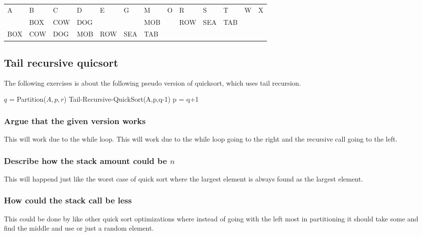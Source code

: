\documentclass[12pt, a4paper]{article}
\begin{document}
\begin{table}[h!]
\begin{tabular}{|l|l|l|l|l|l|l|l|l|l|l|l|l|}
					A   & B                                                 & C   & D   & E   & G   & M   & O                                                                   & R   & S   & T   & W                                                 & X   \\
					    & BOX                                               & COW & DOG &     &     & MOB &                                                                     & ROW & SEA & TAB &                                                   &     \\ \hline
					BOX & COW                                               & DOG & MOB & ROW & SEA & TAB &                                                                     &     &     &     &                                                   &     \\ \hline
					\end{tabular}
					\end{table}	
			\subsection{Tail recursive quicsort}
				The following exercises is about the following pseudo version of quicksort, which uses tail recursion.\\
				\begin{algorithmic}[1]
						\State $q$ = Partition($A,p,r$)
						\State Tail-Recursive-QuickSort(A,p,q-1)
						\State p = q+1
					\EndWhile
				\end{algorithmic}
				\subsubsection{Argue that the given version works}
					This will work due to the while loop. This will work due to the while loop going to the right and the recursive call going to the left.
				\subsubsection{Describe how the stack amount could be $n$}
					This will happend just like the worst case of quick sort where the largest element is always found as the largest element.
				\subsubsection{How could the stack call be less}
					This could be done by like other quick sort optimizations where instead of going with the left most in partitioning it should take some and find the middle and use or just a random element.
				
\end{document}
